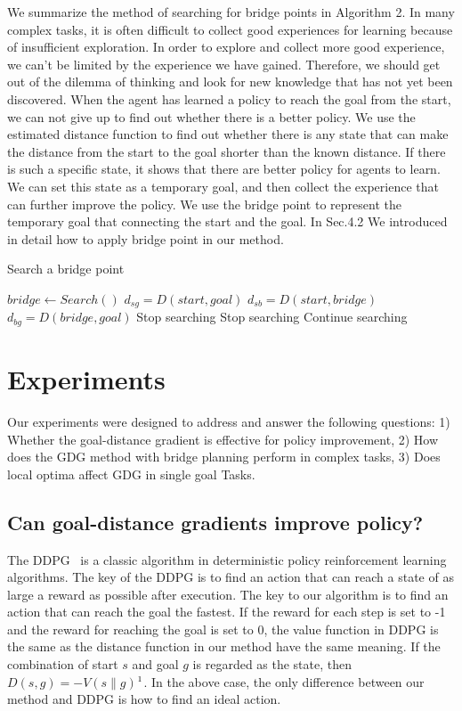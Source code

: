 \documentclass[8pt,twoside,a4paper]{article}
\begin{document}
\par We summarize the method of searching for bridge points in Algorithm 2. In many complex tasks, it is often difficult to collect good experiences for learning because of insufficient exploration. In order to explore and collect more good experience, we can't be limited by the experience we have gained. Therefore, we should get out of the dilemma of thinking and look for new knowledge that has not yet been discovered. When the agent has learned a policy to reach the goal from the start, we can not give up to find out whether there is a better policy. We use the estimated distance function to find out whether there is any state that can make the distance from the start to the goal shorter than the known distance. If there is such a specific state, it shows that there are better policy for agents to learn. We can set this state as a temporary goal, and then collect the experience that can further improve the policy. We use the bridge point to represent the temporary goal that connecting the start and the goal. In Sec.4.2 We introduced in detail how to apply bridge point in our method.
\begin{algorithm}[tb]
	\caption{Search a bridge point}
\begin{algorithmic}[1]
			\STATE $bridge \leftarrow Search()$
			\STATE $d_{sg} = D(start, goal)$
			\STATE $d_{sb} = D(start, bridge)$
			\STATE $d_{bg} = D(bridge, goal)$
				\STATE Stop searching
				\STATE Stop searching
			\ELSE
				\STATE Continue searching
			\ENDIF
		\ENDWHILE 
\end{algorithmic}
\end{algorithm}


\section{Experiments}
Our experiments were designed to address and answer the following questions: 1) Whether the goal-distance gradient is effective for policy improvement, 2) How does the GDG method with bridge planning perform in complex tasks, 3) Does local optima affect GDG in single goal Tasks.


\subsection{Can goal-distance gradients improve policy?}
The DDPG~\cite{lillicrap2016continuous} is a classic algorithm in deterministic policy reinforcement learning algorithms. The key of the DDPG is to find an action that can reach a state of as large a reward as possible after execution. The key to our algorithm is to find an action that can reach the goal the fastest. If the reward for each step is set to -1 and the reward for reaching the goal is set to 0, the value function in DDPG is the same as the distance function in our method have the same meaning. If the combination of start $s$ and goal $g$ is regarded as the state, then $D(s,g) = -V(s\|g)$$\footnote{$\|$ denotes concatenation}$. In the above case, the only difference between our method and DDPG is how to find an ideal action.
\end{document}
